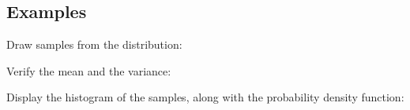 \documentclass[letterpaper,10pt,english]{sphinxmanual}
\begin{document}
\begin{fulllineitems}
\subsection{Examples}
\label{\detokenize{myfpga:id23}}
\sphinxAtStartPar
Draw samples from the distribution:

\begin{sphinxVerbatim}[commandchars=\\\{\}]
     
    
\end{sphinxVerbatim}

\sphinxAtStartPar
Verify the mean and the variance:

\begin{sphinxVerbatim}[commandchars=\\\{\}]
  
\end{sphinxVerbatim}

\begin{sphinxVerbatim}[commandchars=\\\{\}]
   
\end{sphinxVerbatim}

\sphinxAtStartPar
Display the histogram of the samples, along with
the probability density function:


\end{fulllineitems}
\end{document}
